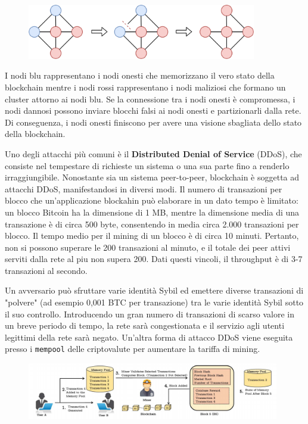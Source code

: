 \begin{figure}[htb!]
    \centering
    \includegraphics[width=10cm]{./Images/cap5/5.6.png}
\end{figure}

I nodi blu rappresentano i nodi onesti che memorizzano il vero stato della blockchain mentre i nodi rossi rappresentano i nodi maliziosi che formano un cluster attorno ai nodi blu. Se la connessione tra i nodi onesti è compromessa, i nodi dannosi possono inviare blocchi falsi ai nodi onesti e partizionarli dalla rete. Di conseguenza, i nodi onesti finiscono per avere una visione sbagliata dello stato della blockchain.

\vspace{5mm}

Uno degli attacchi più comuni è il \textbf{Distributed Denial of Service} (DDoS), che consiste nel tempestare di richieste un sistema o una sua parte fino a renderlo irraggiungibile. Nonostante sia un sistema peer-to-peer, blockchain è soggetta ad attacchi DDoS, manifestandosi in diversi modi. Il numero di transazioni per blocco che un'applicazione blockahin può elaborare in un dato tempo è limitato: un blocco Bitcoin ha la dimensione di 1 MB, mentre la dimensione media di una transazione è di circa 500 byte, consentendo in media circa 2.000 transazioni per blocco. Il tempo medio per il mining di un blocco è di circa 10 minuti. Pertanto, non si possono superare le 200 transazioni al minuto, e il totale dei peer attivi serviti dalla rete al piu non supera 200. Dati questi vincoli, il throughput è di 3-7 transazioni al secondo. 

Un avversario può sfruttare varie identità Sybil ed emettere diverse transazioni di "polvere" (ad esempio 0,001 BTC per transazione) tra le varie identità Sybil sotto il suo controllo. Introducendo un gran numero di transazioni di scarso valore in un breve periodo di tempo, la rete sarà congestionata e il servizio agli utenti legittimi della rete sarà negato. Un'altra forma di attacco DDoS viene eseguita presso i \texttt{mempool} delle criptovalute per aumentare la tariffa di mining.

\begin{figure}[htb!]
    \centering
    \includegraphics[width=11cm]{./Images/cap5/5.7.png}
\end{figure}

